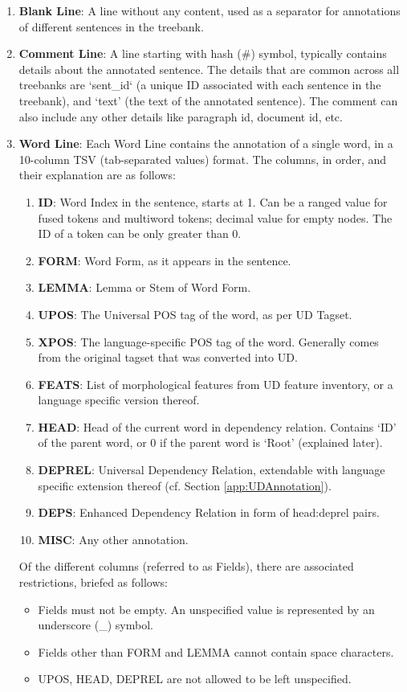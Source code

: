 \begin{enumerate}
    \item \textbf{Blank Line}: A line without any content, used as a separator for annotations of different sentences in the treebank.
    \item \textbf{Comment Line}: A line starting with hash (\#) symbol, typically contains details about the annotated sentence. The details that are common across all treebanks are `sent\_id` (a unique ID associated with each sentence in the treebank), and `text' (the text of the annotated sentence). The comment can also include any other details like paragraph id, document id, etc.
    \item \textbf{Word Line}: Each Word Line contains the annotation of a single word, in a 10-column TSV (tab-separated values) format. The columns, in order, and their explanation are as follows:
    \begin{enumerate}
        \item \textbf{ID}: Word Index in the sentence, starts at 1. Can be a ranged value for fused tokens and multiword tokens; decimal value for empty nodes. The ID of a token can be only greater than 0.
        \item \textbf{FORM}: Word Form, as it appears in the sentence.
        \item \textbf{LEMMA}: Lemma or Stem of Word Form.
        \item \textbf{UPOS}: The Universal POS tag of the word, as per UD Tagset.
        \item \textbf{XPOS}: The language-specific POS tag of the word. Generally comes from the original tagset that was converted into UD. 
        \item \textbf{FEATS}: List of morphological features from UD feature inventory, or a language specific version thereof.
        \item \textbf{HEAD}: Head of the current word in dependency relation. Contains `ID' of the parent word, or 0 if the parent word is `Root' (explained later).
        \item \textbf{DEPREL}: Universal Dependency Relation, extendable with language specific extension thereof (cf. Section \ref{app:UDAnnotation}).
        \item \textbf{DEPS}: Enhanced Dependency Relation in form of head:deprel pairs.
        \item \textbf{MISC}: Any other annotation.
    \end{enumerate}
    Of the different columns (referred to as Fields), there are associated restrictions, briefed as follows:
    \begin{itemize}
        \item Fields must not be empty. An unspecified value is represented by an underscore (\_) symbol. 
        \item Fields other than FORM and LEMMA cannot contain space characters.
        \item UPOS, HEAD, DEPREL are not allowed to be left unspecified.
    \end{itemize}
\end{enumerate}

